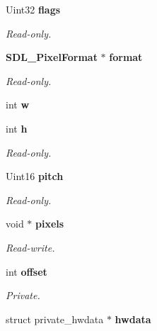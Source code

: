 \begin{DoxyCompactItemize}
\item 
Uint32 {\bf flags}\label{struct_s_d_l___surface_a86d78b665d5dfd7aa1dd9696b067641b}

\begin{DoxyCompactList}\small\item\em Read-\/only. \end{DoxyCompactList}\item 
{\bf S\+D\+L\+\_\+\+Pixel\+Format} $\ast$ {\bf format}\label{struct_s_d_l___surface_a0a90721f947c10c3b79e02ccb419ca62}

\begin{DoxyCompactList}\small\item\em Read-\/only. \end{DoxyCompactList}\item 
int {\bfseries w}\label{struct_s_d_l___surface_a9b0ec7185dcdb2a3530a9160a6ea83d9}

\item 
int {\bf h}\label{struct_s_d_l___surface_af33bcf87a1f5e10a99b3c7e8626b38c8}

\begin{DoxyCompactList}\small\item\em Read-\/only. \end{DoxyCompactList}\item 
Uint16 {\bf pitch}\label{struct_s_d_l___surface_a53fd25784c0f6efd7dd19bb0afce5452}

\begin{DoxyCompactList}\small\item\em Read-\/only. \end{DoxyCompactList}\item 
void $\ast$ {\bf pixels}\label{struct_s_d_l___surface_abd9597e0e084b8ef33fe0397bc26d911}

\begin{DoxyCompactList}\small\item\em Read-\/write. \end{DoxyCompactList}\item 
int {\bf offset}\label{struct_s_d_l___surface_ab40c060fa976dbb25bebc7869132ffda}

\begin{DoxyCompactList}\small\item\em Private. \end{DoxyCompactList}\item 
struct private\+\_\+hwdata $\ast$ {\bf hwdata}\label{struct_s_d_l___surface_a2d3ce688b6cfb72875f2411ea0560f18}


\end{DoxyCompactItemize}
